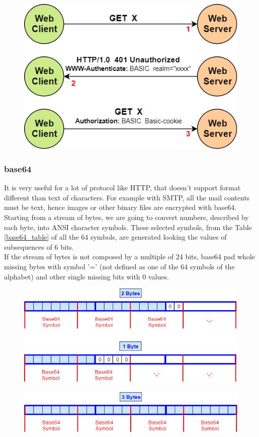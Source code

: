 \begin{figure}[h]
\centering
\includegraphics[scale=0.5]{Images/HTTP/auth}
\end{figure}
\clearpage
\subsubsection{base64}
It is very useful for a lot of protocol like HTTP, that doesn't support format different than text of characters. For example with SMTP, all the mail contents must be text, hence images or other binary files are encrypted with base64.\\
Starting from a stream of bytes, we are going to convert numbers, described by each byte, into ANSI character symbols. These selected symbols, from the Table \ref{base64_table} of all the 64 symbols, are generated looking the values of subsequences of 6 bits.\\
If the stream of bytes is not composed by a multiple of 24 bits, base64 pad whole missing bytes with symbol '=' (not defined as one of the 64 symbols of the alphabet) and other single missing bits with 0 values.
\begin{figure}[h]
\centering
\includegraphics[scale=0.5]{Images/HTTP/pad_base64}
\end{figure}
\begin{figure}[h]
\centering
\includegraphics[scale=0.5]{Images/HTTP/base64}
\end{figure}
\vspace{1cm}

